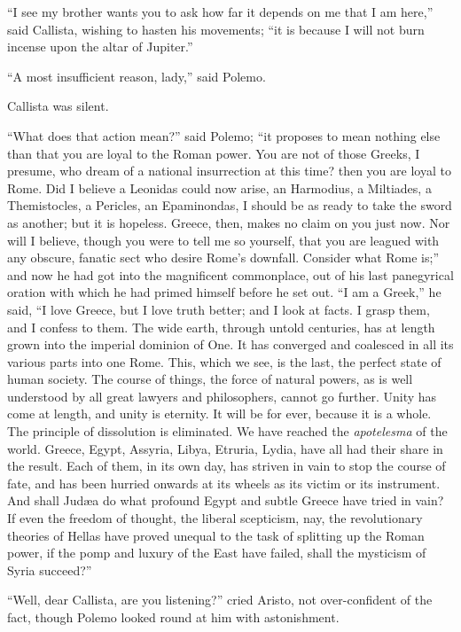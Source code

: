 ``I see my brother wants you to ask how far it depends on me
that I am here,'' said Callista, wishing to hasten his movements;
``it is because I will not burn incense upon the altar of
Jupiter.''

``A most insufficient reason, lady,'' said Polemo.

Callista was silent.

``What does that action mean?'' said Polemo; ``it
proposes to mean nothing else than that you are loyal to the Roman
power. You are not of those Greeks, I presume, who dream of a national
insurrection at this time? then you are loyal to Rome. Did I
believe a Leonidas could now arise, an Harmodius, a Miltiades, a
Themistocles, a Pericles, an Epaminondas, I should be as ready to take
the sword as another; but it is hopeless. Greece, then, makes no claim
on you just now. Nor will I believe, though you were to tell me so
yourself, that you are leagued with any obscure, fanatic sect who
desire Rome's downfall. Consider what Rome is;'' and now he had
got into the magnificent commonplace, out of his last panegyrical
oration with which he had primed himself before he set out. ``I am
a Greek,'' he said, ``I love Greece, but I love truth better;
and I look at facts. I grasp them, and I confess to them. The wide
earth, through untold centuries, has at length grown into the imperial
dominion of One. It has converged and coalesced in all its various
parts into one Rome. This, which we see, is the last, the perfect
state of human society. The course of things, the force of natural
powers, as is well understood by all great lawyers and philosophers,
cannot go further. Unity has come at length, and unity is eternity. It
will be for ever, because it is a whole. The principle of dissolution
is eliminated. We have reached the \emph{apotelesma} of the world.
Greece, Egypt, Assyria, Libya, Etruria, Lydia, have all had their
share in the result. Each of them, in its own day, has striven in vain
to stop the course of fate, and has been hurried onwards at its wheels
as its victim or its instrument. And shall Judæa do what profound
Egypt and subtle Greece have tried in vain? If even the freedom
of thought, the liberal scepticism, nay, the revolutionary theories of
Hellas have proved unequal to the task of splitting up the Roman
power, if the pomp and luxury of the East have failed, shall the
mysticism of Syria succeed?''

``Well, dear Callista, are you listening?'' cried Aristo,
not over-confident of the fact, though Polemo looked round at him with
astonishment.


